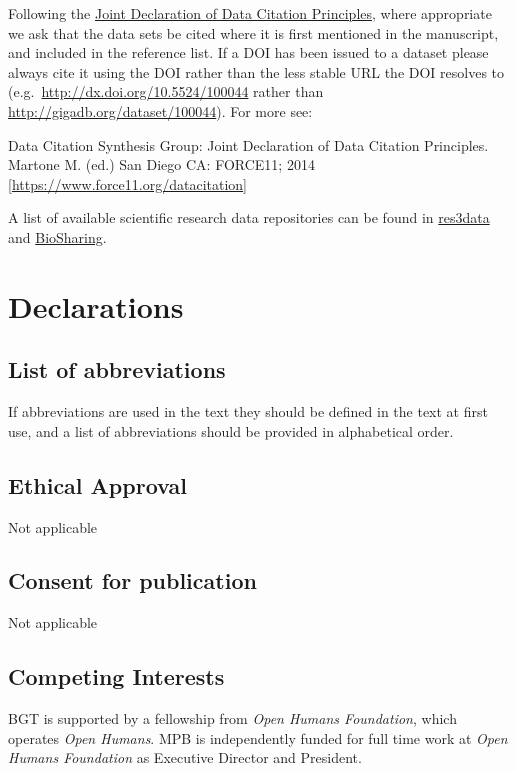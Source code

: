 \documentclass[a4paper,num-refs]{oup-contemporary}
\begin{document}
Following the \href{https://www.force11.org/group/joint-declaration-data-citation-principles-final}{Joint Declaration of Data Citation Principles}, where appropriate we ask that the data sets be cited where it is first mentioned in the manuscript, and included in the reference list. If a DOI has been issued to a dataset please always cite it using the DOI rather than the less stable URL the DOI resolves to (e.g.~\url{http://dx.doi.org/10.5524/100044} rather than \url{http://gigadb.org/dataset/100044}). For more see:

Data Citation Synthesis Group: Joint Declaration of Data Citation Principles. Martone M. (ed.) San Diego CA: FORCE11; 2014 [\url{https://www.force11.org/datacitation}]

A list of available scientific research data repositories can be found in \href{http://www.re3data.org/}{res3data} and \href{https://biosharing.org/}{BioSharing}.

\section{Declarations}

\subsection{List of abbreviations}
If abbreviations are used in the text they should be defined in the text at first use, and a list of abbreviations should be provided in alphabetical order.

\subsection{Ethical Approval}

Not applicable

\subsection{Consent for publication}
Not applicable

\subsection{Competing Interests}

BGT is supported by a fellowship from \textit{Open Humans Foundation}, which operates \textit{Open Humans}.
MPB is independently funded for full time work at \textit{Open Humans Foundation} as Executive Director and President.
\end{document}
